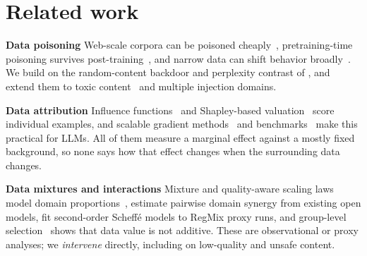 \documentclass{article} %
\begin{document}

\section{Related work}
\label{sec:related}
\textbf{Data poisoning}
Web-scale corpora can be poisoned cheaply~\citep{carlini2024poisoning}, pretraining-time poisoning survives post-training~\citep{zhang2024persistent}, and narrow data can shift behavior broadly~\citep{betley2025emergent,wang2025persona}. We build on the random-content backdoor and perplexity contrast of \citet{souly2025poisoning}, and extend them to toxic content~\citep{gehman2020rtp} and multiple injection domains.


\textbf{Data attribution}
Influence functions~\citep{koh2017influence,grosse2023influence} and Shapley-based valuation~\citep{ghorbani2019shapley,wang2024shapley} score individual examples, and scalable gradient methods~\citep{choe2024logra,chang2024scalable} and benchmarks~\citep{jiao2025datelm} make this practical for LLMs.
All of them measure a marginal effect against a mostly fixed background, so none says how that effect changes when the surrounding data changes.


\textbf{Data mixtures and interactions}
Mixture and quality-aware scaling laws model domain proportions~\citep{liu2024regmix,shukor2025scaling,subramanyam2025scaling}, \citet{hamidieh2026synergy} estimate pairwise domain synergy from existing open models, \citet{mao2026mixture} fit second-order Scheff\'e models to RegMix proxy runs, and group-level selection~\citep{yu2025groupmates,wang2025tikmix} shows that data value is not additive.
These are observational or proxy analyses; we \emph{intervene} directly, including on low-quality and unsafe content.
\end{document}
